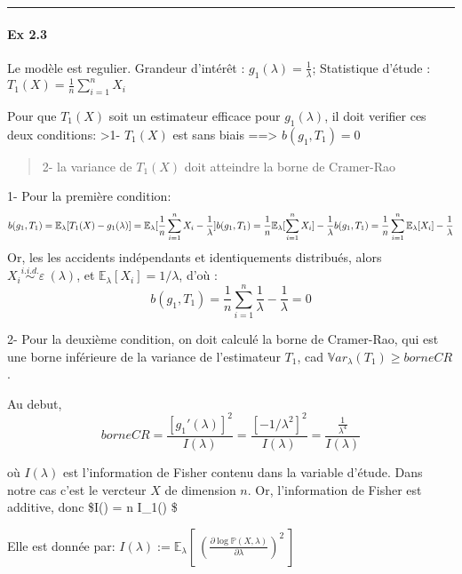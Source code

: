 \documentclass[11pt]{article}
\begin{document}
    \begin{center}\rule{0.5\linewidth}{\linethickness}\end{center}

\paragraph{Ex 2.3}\label{ex-2.3}

    Le modèle est regulier. Grandeur d'intérêt :
\(g_1(\lambda)=\frac{1}{\lambda}\); Statistique d'étude :
\(T_1(X)= \frac{1}{n}\sum_{i=1}^nX_i\)

Pour que \(T_1(X)\) soit un estimateur efficace pour \(g_1(\lambda)\),
il doit verifier ces deux conditions: \textgreater{}1- \(T_1(X)\) est
sans biais ==\textgreater{} \(b(g_1,T_1) = 0\)

\begin{quote}
2- la variance de \(T_1(X)\) doit atteindre la borne de Cramer-Rao
\end{quote}

    1- Pour la première condition: \[
    b(g_1,T_1) = \mathbb{E}_\lambda[T_1(X)-g_1(\lambda)] = \mathbb{E}_\lambda[\frac{1}{n}\sum_{i=1}^nX_i - \frac{1}{\lambda}]\\
    b(g_1,T_1) = \frac{1}{n}\mathbb{E}_\lambda[\sum_{i=1}^nX_i] - \frac{1}{\lambda}\\
    b(g_1,T_1) = \frac{1}{n}\sum_{i=1}^n\mathbb{E}_\lambda[X_i] - \frac{1}{\lambda}\\
\] Or, les les accidents indépendants et identiquements distribués,
alors \(X_i \stackrel{i.i.d.}{\sim} \varepsilon\ (\lambda)\), et
\(\mathbb{E}_\lambda[X_i] = 1/\lambda\), d'où : \[
     b(g_1,T_1) = \frac{1}{n}\sum_{i=1}^n\frac{1}{\lambda} - \frac{1}{\lambda} = 0
\]

    2- Pour la deuxième condition, on doit calculé la borne de Cramer-Rao,
qui est une borne inférieure de la variance de l'estimateur \(T_1\), cad
\(\mathbb{V}ar_\lambda(T_1) \geq borneCR\).

Au debut,
\[borneCR = \frac{[g_1'(\lambda)]^2}{I(\lambda)} = \frac{[-1/\lambda^2]^2}{I(\lambda)} = \frac{\frac{1}{\lambda^4}}{I(\lambda)}\]

où \(I(\lambda)\) est l'information de Fisher contenu dans la variable
d'étude. Dans notre cas c'est le vercteur \(X\) de dimension \(n\). Or,
l'information de Fisher est additive, donc \$I(\lambda) = n
I\_1(\lambda) \$

Elle est donnée par:
\(I(\lambda) := \mathbb{E}_\lambda[\ (\frac{\partial \log{\mathbb{P}(X,\lambda)}} {\partial\lambda})^2\ ]\)
\end{document}
